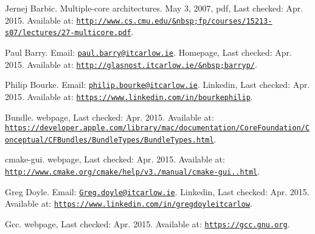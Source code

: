 
\begin{DoxyDescription}
\item[\label{_CITEREF_multiple-corearchitectures}%
\mbox{[}1\mbox{]}]Jernej Barbic. Multiple-\/core architectures. May 3, 2007, pdf, Last checked\+: Apr. 2015. Available at\+: \href{http://www.cs.cmu.edu/~fp/courses/15213-s07/lectures/27-multicore.pdf}{\tt http\+://www.\+cs.\+cmu.\+edu/\&nbsp;fp/courses/15213-\/s07/lectures/27-\/multicore.\+pdf}.


\item[\label{_CITEREF_paulbarry}%
\mbox{[}2\mbox{]}]Paul Barry. Email\+: \href{mailto:paul.barry@itcarlow.ie}{\tt paul.\+barry@itcarlow.\+ie}. Homepage, Last checked\+: Apr. 2015. Available at\+: \href{http://glasnost.itcarlow.ie/~barryp/}{\tt http\+://glasnost.\+itcarlow.\+ie/\&nbsp;barryp/}.


\item[\label{_CITEREF_philipbourke}%
\mbox{[}3\mbox{]}]Philip Bourke. Email\+: \href{mailto:philip.bourke@itcarlow.ie}{\tt philip.\+bourke@itcarlow.\+ie}. Linkedin, Last checked\+: Apr. 2015. Available at\+: \href{https://www.linkedin.com/in/bourkephilip}{\tt https\+://www.\+linkedin.\+com/in/bourkephilip}.


\item[\label{_CITEREF_bundle}%
\mbox{[}4\mbox{]}]Bundle. webpage, Last checked\+: Apr. 2015. Available at\+: \href{https://developer.apple.com/library/mac/documentation/CoreFoundation/Conceptual/CFBundles/BundleTypes/BundleTypes.html}{\tt https\+://developer.\+apple.\+com/library/mac/documentation/\+Core\+Foundation/\+Conceptual/\+C\+F\+Bundles/\+Bundle\+Types/\+Bundle\+Types.\+html}.


\item[\label{_CITEREF_cmakegui}%
\mbox{[}5\mbox{]}]cmake-\/gui. webpage, Last checked\+: Apr. 2015. Available at\+: \href{http://www.cmake.org/cmake/help/v3.0/manual/cmake-gui.1.html}{\tt http\+://www.\+cmake.\+org/cmake/help/v3./manual/cmake-\/gui..\+html}.


\item[\label{_CITEREF_gregdoyle}%
\mbox{[}6\mbox{]}]Greg Doyle. Email\+: \href{mailto:Greg.doyle@itcarlow.ie}{\tt Greg.\+doyle@itcarlow.\+ie}. Linkedin, Last checked\+: Apr. 2015. Available at\+: \href{https://www.linkedin.com/in/gregdoyleitcarlow}{\tt https\+://www.\+linkedin.\+com/in/gregdoyleitcarlow}.


\item[\label{_CITEREF_gcc}%
\mbox{[}7\mbox{]}]Gcc. webpage, Last checked\+: Apr. 2015. Available at\+: \href{https://gcc.gnu.org}{\tt https\+://gcc.\+gnu.\+org}.



\end{DoxyDescription}
